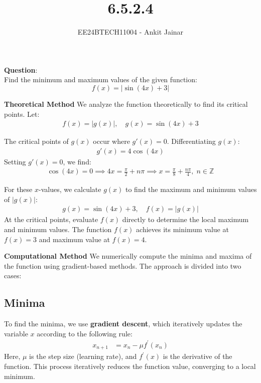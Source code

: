 \documentclass[journal]{IEEEtran}
\begin{document}

\vspace{3cm}

\title{6.5.2.4}
\author{EE24BTECH11004 - Ankit Jainar}
\maketitle

\renewcommand{\thefigure}{\theenumi}
\renewcommand{\thetable}{\theenumi}
\setlength{\intextsep}{10pt}


\textbf{Question}:\\
Find the minimum and maximum values of the given function:\\
\[
f(x) = |\sin(4x) + 3|
\]

\noindent \textbf{Theoretical Method}  
We analyze the function theoretically to find its critical points. Let:
\begin{align}
    f(x) = |g(x)|, \quad g(x) = \sin(4x) + 3
\end{align}

The critical points of \(g(x)\) occur where \(g'(x) = 0\). Differentiating \(g(x)\):  
\begin{align}
    g'(x) = 4\cos(4x)
\end{align}  
Setting \(g'(x) = 0\), we find:  
\begin{align}
    \cos(4x) = 0 \implies 4x = \frac{\pi}{2} + n\pi \implies x = \frac{\pi}{8} + \frac{n\pi}{4}, \; n \in \mathbb{Z}
\end{align}

For these \(x\)-values, we calculate \(g(x)\) to find the maximum and minimum values of \(|g(x)|\):  
\begin{align}
    g(x) = \sin(4x) + 3, \quad f(x) = |g(x)|
\end{align}  
At the critical points, evaluate \(f(x)\) directly to determine the local maximum and minimum values. The function \(f(x)\) achieves its minimum value at \(f(x) = 3\) and maximum value at \(f(x) = 4\).

\noindent \textbf{Computational Method}  
We numerically compute the minima and maxima of the function using gradient-based methods. The approach is divided into two cases:  

\subsection*{Minima}  
To find the minima, we use \textbf{gradient descent}, which iteratively updates the variable \(x\) according to the following rule:  
\begin{align}
    x_{n+1} &= x_n - \mu f^{\prime}(x_n)
\end{align}  
Here, \( \mu \) is the step size (learning rate), and \( f^{\prime}(x) \) is the derivative of the function. This process iteratively reduces the function value, converging to a local minimum.  
\end{document}
